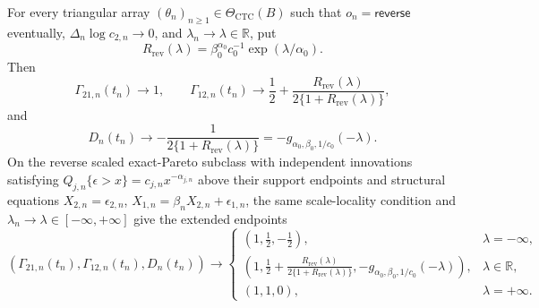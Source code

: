For every triangular array \((\theta_n)_{n\geq1}\in\Theta_{\mathrm{CTC}}(B)\) such that \(o_n=\mathsf{reverse}\) eventually, \(\Delta_n\log c_{2,n}\to0\), and \(\lambda_n\to\lambda\in\mathbb R\), put
\[
R_{\mathrm{rev}}(\lambda)=\beta_0^{\alpha_0}c_0^{-1}\exp(\lambda/\alpha_0).
\]
Then
\[
\Gamma_{21,n}(t_n)\to1,
\qquad
\Gamma_{12,n}(t_n)\to\frac12+\frac{R_{\mathrm{rev}}(\lambda)}{2\{1+R_{\mathrm{rev}}(\lambda)\}},
\]
and
\[
D_n(t_n)\to-\frac1{2\{1+R_{\mathrm{rev}}(\lambda)\}}
=-g_{\alpha_0,\beta_0,1/c_0}(-\lambda).
\]
On the reverse scaled exact-Pareto subclass with independent innovations satisfying \(Q_{j,n}\{\epsilon>x\}=c_{j,n}x^{-\alpha_{j,n}}\) above their support endpoints and structural equations \(X_{2,n}=\epsilon_{2,n}\), \(X_{1,n}=\beta_nX_{2,n}+\epsilon_{1,n}\), the same scale-locality condition and \(\lambda_n\to\lambda\in[-\infty,+\infty]\) give the extended endpoints
\[
(\Gamma_{21,n}(t_n),\Gamma_{12,n}(t_n),D_n(t_n))\longrightarrow
\begin{cases}
(1,\frac12,-\frac12), & \lambda=-\infty,\\
\left(1,\frac12+\frac{R_{\mathrm{rev}}(\lambda)}{2\{1+R_{\mathrm{rev}}(\lambda)\}},-g_{\alpha_0,\beta_0,1/c_0}(-\lambda)\right), & \lambda\in\mathbb R,\\
(1,1,0), & \lambda=+\infty.
\end{cases}
\]